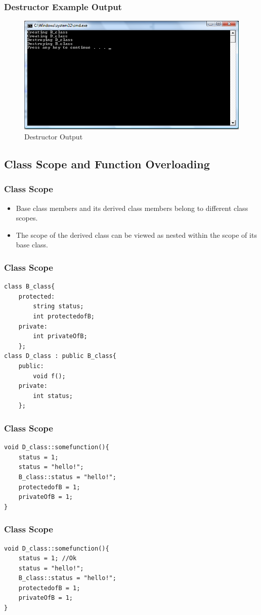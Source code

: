 \documentclass{beamer}
\newtheorem{Key points}{Key points}
\begin{document}
\begin{frame}[fragile]
\frametitle{Destructor Example Output}
  \begin{figure}
    \centering
\includegraphics[width=0.8\columnwidth]{des.png}    
\caption{Destructor Output}
  \end{figure}
\end{frame}
\begin{frame}[fragile]
\section{Class Scope and Function Overloading}
\frametitle{Class Scope}
\begin{itemize}
\item Base class members and its derived class members belong to different class scopes.
\item The scope of the derived class can be viewed as nested within the scope of its base class.
\end{itemize}
\end{frame}
\begin{frame}[fragile]
\frametitle{Class Scope}
\begin{lstlisting}
class B_class{
	protected:
		string status;
		int protectedofB;
	private:
		int privateOfB;
	};
class D_class : public B_class{
	public:
		void f();
	private:
		int status;
	};
\end{lstlisting}
\end{frame}
\begin{frame}[fragile]
\frametitle{Class Scope}
\begin{lstlisting}
void D_class::somefunction(){
	status = 1; 
	status = "hello!"; 
	B_class::status = "hello!"; 
	protectedofB = 1; 
	privateOfB = 1; 
}
\end{lstlisting}
\end{frame}

\begin{frame}[fragile]
\frametitle{Class Scope}
\begin{lstlisting}
void D_class::somefunction(){
	status = 1; //Ok
	status = "hello!"; 
	B_class::status = "hello!"; 
	protectedofB = 1; 
	privateOfB = 1; 
}
\end{lstlisting}
\end{frame}
\end{document}

